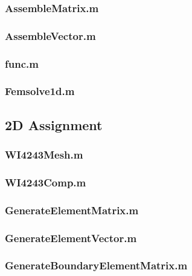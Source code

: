 \documentclass[10pt,a4paper]{article}
\begin{document}
\subsubsection{AssembleMatrix.m}


\subsubsection{AssembleVector.m}


\subsubsection{func.m}


\subsubsection{Femsolve1d.m}


\newpage
\subsection{2D Assignment}
\lstset{inputpath=./Functions/2D}

\subsubsection{WI4243Mesh.m}


\subsubsection{WI4243Comp.m}


\subsubsection{GenerateElementMatrix.m}


\subsubsection{GenerateElementVector.m}


\subsubsection{GenerateBoundaryElementMatrix.m}

\end{document}
